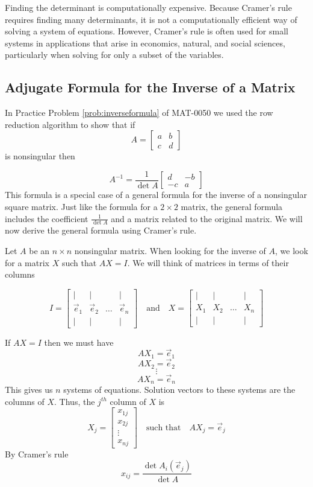 \documentclass{ximera}
\begin{document}
Finding the determinant is computationally expensive.  Because Cramer's rule requires finding many determinants, it is not a computationally efficient way of solving a system of equations.  However, Cramer's rule is often used for small systems in applications that arise in economics, natural, and social sciences, particularly when solving for only a subset of the variables.

\subsection*{Adjugate Formula for the Inverse of a Matrix}

In Practice Problem \ref{prob:inverseformula} of MAT-0050 we used the row reduction algorithm to show that if $$A=\begin{bmatrix}a&b\\c&d\end{bmatrix}$$ is nonsingular then 

\begin{equation}\label{eq:twobytwoinverse}A^{-1}=\frac{1}{\det{A}}\begin{bmatrix}d&-b\\-c&a\end{bmatrix}\end{equation}
This formula is a special case of a general formula for the inverse of a nonsingular square matrix.  Just like the formula for a $2\times 2$ matrix, the general formula  includes the coefficient $\frac{1}{\det{A}}$ and a matrix related to the original matrix.  We will now derive the general formula using Cramer's rule.

Let $A$ be an $n\times n$ nonsingular matrix.  When looking for the inverse of $A$, we look for a matrix $X$ such that $AX=I$.  We will think of matrices in terms of their columns

$$I=\begin{bmatrix}
           | & |& &|\\
		\vec{e}_1 & \vec{e}_2&\dots&\vec{e}_n\\
		| & |& &|
         \end{bmatrix}\quad\text{and}\quad X=\begin{bmatrix}
           | & |& &|\\
		X_1 & X_2&\dots&X_n\\
		| & |& &|
         \end{bmatrix}$$

If $AX=I$ then we must have
$$AX_1=\vec{e}_1$$
$$AX_2=\vec{e}_2$$
$$\vdots$$
$$AX_n=\vec{e}_n$$
This gives us $n$ systems of equations.  Solution vectors to these systems are the columns of $X$.  Thus, the $j^{th}$ column of $X$ is
$$X_j=\begin{bmatrix}x_{1j}\\x_{2j}\\\vdots\\x_{nj}\end{bmatrix}\quad\text{such that}\quad AX_j=\vec{e}_j$$
By Cramer's rule 
$$x_{ij}=\frac{\det{A_i(\vec{e}_j)}}{\det{A}}$$
         
\end{document}
